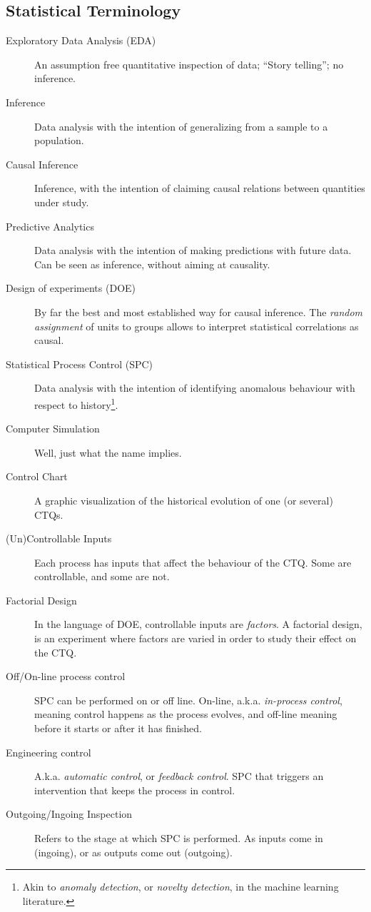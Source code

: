 \documentclass[12pt,a4paper]{report}
\theoremstyle{plain}
\theoremstyle{definition}
\begin{document}
\subsection{Statistical Terminology}
\label{sec:terminology_statistical}
\begin{description}
\item [Exploratory Data Analysis (EDA)] An assumption free quantitative inspection of data; ``Story telling''; no inference.
\item [Inference] Data analysis with the intention of generalizing from a sample to a population.
\item [Causal Inference] Inference, with the intention of claiming causal relations between quantities under study.
\item [Predictive Analytics] Data analysis with the intention of making predictions with future data. Can be seen as inference, without aiming at causality.
\item [Design of experiments (DOE)]  By far the best and most established way for causal inference. The \emph{random assignment} of units to groups allows to interpret statistical correlations as causal.
\item [Statistical Process Control (SPC)] Data analysis with the intention of identifying anomalous behaviour with respect to history\footnote{Akin to \emph{anomaly detection}, or \emph{novelty detection}, in the machine learning literature.}. 
\item [Computer Simulation] Well, just what the name implies. 
\item [Control Chart] A graphic visualization of the historical evolution of one (or several) CTQs. 
\item [(Un)Controllable Inputs] Each process has inputs that affect the behaviour of the CTQ. Some are controllable, and some are not.
\item [Factorial Design] In the language of DOE, controllable inputs are \emph{factors}. A factorial design, is an experiment where factors are varied in order to study their effect on the CTQ.
\item [Off/On-line process control] SPC can be performed on or off line. 
On-line, a.k.a. \emph{in-process control},  meaning control happens as the process evolves, and off-line meaning before it starts or after it has finished.
\item [Engineering control] A.k.a. \emph{automatic control}, or \emph{feedback control}. SPC that triggers an intervention that keeps the process in control.
\item [Outgoing/Ingoing Inspection] Refers to the stage at which SPC is performed. As inputs come in (ingoing), or as outputs come out (outgoing). 
\end{description}
\end{document}
